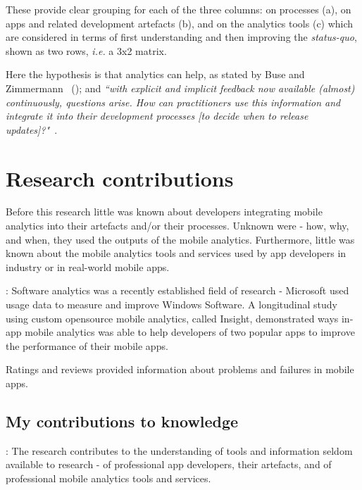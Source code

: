 These provide clear grouping for each of the three columns: on processes (a), on apps and related development artefacts (b), and on the analytics tools (c) which are considered in terms of first understanding and then improving the \emph{status-quo}, shown as two rows, \emph{i.e.} a 3x2 matrix. 


Here the hypothesis is that analytics can help, as stated by Buse and Zimmermann ~(\citeyear{buse_analytics_2010}); and \emph{``with explicit and implicit feedback now available (almost) continuously, questions arise. How can practitioners use this information and integrate it into their development processes [to decide when to release updates]?"}~.


\section{Research contributions}
Before this research little was known about developers integrating mobile analytics into their artefacts and/or their processes. Unknown were - how, why, and when, they used the outputs of the mobile analytics. Furthermore, little was known about the mobile analytics tools and services used by app developers in industry or in real-world mobile apps.

: 
Software analytics was a recently established field of research - Microsoft used usage data to measure and improve Windows Software. A longitudinal study using custom opensource mobile analytics, called Insight, demonstrated ways in-app mobile analytics was able to help developers of two popular apps to improve the performance of their mobile apps.

Ratings and reviews provided information about problems and failures in mobile apps.

\subsection{My contributions to knowledge}:
The research contributes to the understanding of tools and information seldom available to research - of professional app developers, their artefacts, and of professional mobile analytics tools and services. 

